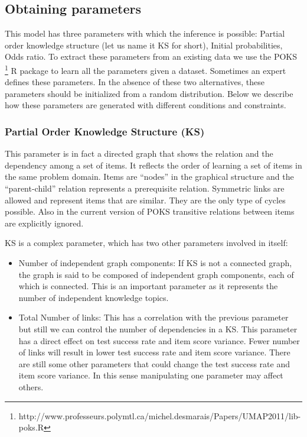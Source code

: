 \subsection{Obtaining parameters}
This model has three parameters with which the inference is possible: Partial order knowledge structure (let us name it KS for short), Initial probabilities, Odds ratio. To extract these parameters from an existing data we use the POKS \footnote{http://www.professeurs.polymtl.ca/michel.desmarais/Papers/UMAP2011/lib-poks.R} R package to learn all the parameters given a dataset. Sometimes an expert defines these parameters. In the absence of these two alternatives, these parameters should be initialized from a random distribution. Below we describe how these parameters are generated with different conditions and constraints.

\subsubsection{Partial Order Knowledge Structure (KS)}
This parameter is in fact a directed graph that shows the relation and the dependency among a set of items. It reflects the order of learning a set of items in the same problem domain. Items are ``nodes'' in the graphical structure and the ``parent-child'' relation represents a prerequisite relation. Symmetric links are allowed and represent items that are similar. They are the only type of cycles possible. Also in the current version of POKS transitive relations between items are explicitly ignored. 

KS is a complex parameter, which has two other parameters involved in itself:
\begin{itemize}
\item Number of independent graph components: If KS is not a connected graph, the graph is said to be composed of independent graph components, each of which is connected. This is an important parameter as it represents the number of independent knowledge topics.
\item Total Number of links: This has a correlation with the previous parameter but still we can control the number of dependencies in a KS. This parameter has a direct effect on test success rate and item score variance. Fewer number of links will result in lower test success rate and item score variance. There are still some other parameters that could change the test success rate and item score variance. In this sense manipulating one parameter may affect others.
\end{itemize} 

